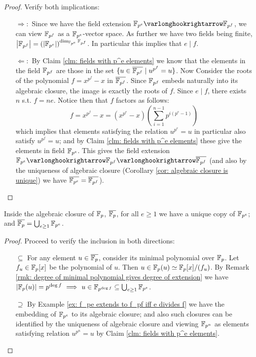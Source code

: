 \begin{proof}
    Verify both implications:
    \begin{itemize}
        \item[$\Rightarrow:$] Since we have the field extension $\F_{p^e} \ext \F_{p^f}$, we can view $\mathbb{F}_{p^f}$ as a $\mathbb{F}_{p^e}$-vector space. As further we have two fields being finite, $\left|\mathbb{F}_{p^f}\right| = \left( \left|\mathbb{F}_{p^e}\right| \right)^{\dim_{\mathbb{F}_{p^e}} \mathbb{F}_{p^f}}$. In particular this implies that $e \mid f$.
        \item[$\Leftarrow:$] By Claim \ref{clm: fields with p^e elements} we know that the elements in the field $\mathbb{F}_{p^f}$ are those in the set $\{ u \in \overline{\mathbb{F}_{p^f}} \mid u^{p^f} = u \}$. Now Consider the roots of the polynomial $f = x^{p^f} - x$ in $\overline{\mathbb{F}_{p^f}}$. Since $\mathbb{F}_{p^f}$ embeds naturally into its algebraic closure, the image is exactly the roots of $f$. Since $e \mid f$, there exists $n$ s.t. $f = ne$. Notice then that $f$ factors as follows:
        \[
            f = x^{p^f} - x = \left( x^{p^e} - x \right) \left( \sum_{i = 1}^{n-1} p^{i(p^e - 1)} \right)
        \]
        which implies that elements satisfying the relation $u^{p^e} = u$ in particular also satisfy $u^{p^f} = u$; and by Claim \ref{clm: fields with p^e elements} these give the elements in field $\mathbb{F}_{p^e}$. This gives the field extension $\F_{p^e} \ext \F_{p^f} \ext \overline{\F_{p^f}}$ (and also by the uniqueness of algebraic closure (Corollary \ref{cor: algebraic closure is unique}) we have $\overline{\mathbb{F}_{p^e}} = \overline{\mathbb{F}_{p^f}}$).
    \end{itemize}
\end{proof}
    
\begin{example}
    Inside the algebraic closure of $\mathbb{F}_p$, $\overline{\mathbb{F}_p}$, for all $e \geq 1$ we have a unique copy of $\mathbb{F}_{p^e}$; and $\overline{\mathbb{F}_p} = \bigcup_{e \geq 1} \mathbb{F}_{p^e}$.
\end{example}

\begin{proof}
    Proceed to verify the inclusion in both directions:
    \begin{enumerate}
        \item[$\subseteq$] For any element $u \in \overline{\mathbb{F}_p}$, consider its minimal polynomial over $\mathbb{F}_p$. Let $f_u \in \mathbb{F}_p[x]$ be the polynomial of $u$. Then $u \in \mathbb{F}_p(u) \simeq \mathbb{F}_p[x]/(f_u)$. By Remark \ref{rmk: degree of minimal polynomial gives degree of extension} we have $\left|\mathbb{F}_p(u)\right| = p^{\deg f} \ \Longrightarrow\  u \in \mathbb{F}_{p^{\deg f}} \subseteq \bigcup_{e \geq 1} \mathbb{F}_{p^e}$. 
        \item[$\supseteq$] By Example \ref{ex: f_pe extends to f_pf iff e divides f} we have the embedding of $\mathbb{F}_{p^e}$ to its algebraic closure; and also such closures can be identified by the uniqueness of algebraic closure and viewing $\mathbb{F}_{p^n}$ as elements satisfying relation $u^{p^n} = u$ by Claim \ref{clm: fields with p^e elements}.
    \end{enumerate}
\end{proof}

